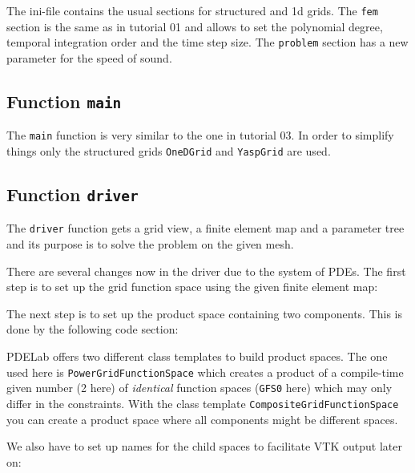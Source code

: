 \documentclass[a4paper,12pt]{article}
\begin{document}
The ini-file contains the usual sections for structured and 1d grids. The
\lstinline{fem} section is the same as in tutorial 01 and allows to set
the polynomial degree, temporal integration order and the time step size.
The \lstinline{problem} section has a new parameter for the speed of sound.


\subsection{Function \lstinline{main}}

The \lstinline{main} function is very similar to the one in tutorial 03.
In order to simplify things only the structured grids \lstinline{OneDGrid}
and \lstinline{YaspGrid} are used.

\subsection{Function \lstinline{driver}}
\label{sec:funct-driver}

The \lstinline{driver} function gets a grid view, a finite element
map and a parameter tree and its purpose is to solve the problem on
the given mesh.


There are several changes now in the driver due to the system of PDEs.
The first step is to set up the grid function space using the given finite
element map:


The next step is to set up the product space containing
two components. This is done by the following code section:

PDELab offers two different class templates to build product spaces. The
one used here is \lstinline{PowerGridFunctionSpace} which creates
a product of a compile-time given number (2 here)
of \textit{identical} function spaces (\lstinline{GFS0} here)
which may only differ in the constraints. With the
class template \lstinline{CompositeGridFunctionSpace} you can create
a product space where all components might be different spaces.

We also have to set up names for the child spaces to facilitate VTK output later on:

\end{document}
